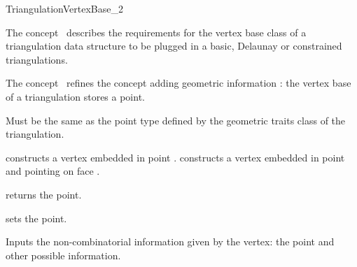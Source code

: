 

\begin{ccRefConcept}{TriangulationVertexBase_2}


\ccDefinition
  
The concept \ccRefName\ describes the requirements for the
vertex base class of a triangulation data structure
to be plugged in a basic, Delaunay or constrained
triangulations.

The concept \ccRefName\ refines the concept
adding geometric information :
the vertex base of a triangulation stores a point.


\ccTypes
{}
{Must be the same as the point type 
defined by the geometric traits class of the triangulation.} 

\ccCreation
{}  %


{constructs a vertex embedded in point .}
{constructs a vertex embedded in point  and pointing on face .}

\ccAccessFunctions
{}
{returns  the point.}
\ccGlue
{}

{sets the point.}


{Inputs the non-combinatorial information given by the vertex: 
the point and other possible information.}


\end{ccRefConcept}
